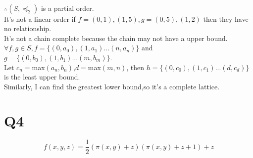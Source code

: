 \documentclass[12pt]{article}
\begin{document}
\begin{enumerate}[(i)]
\\$\therefore (S,\preceq_2)$ is a partial order.
\\It's not a linear order if $f={(0,1),(1,5)},g={(0,5),(1,2)}$ then they have no relationship.
\\It's not a chain complete because the chain may not have a upper bound.
\\$\forall f,g\in S,f=\{(0,a_0),(1,a_1)...(n,a_n)\}$ and $g=\{(0,b_0),(1,b_1)...(m,b_m)\}$.\\Let $c_n=$max$(a_n,b_n)$,$d=$max$(m,n)$, then $h=\{(0,c_0),(1,c_1)...(d,c_d)\}$ is the least upper bound.
\\Similarly, I can find the greatest lower bound,so it's a complete lattice.
\end{enumerate}
\section{Q4}
$$f(x,y,z)=\frac{1}{2}(\pi(x,y)+z)(\pi(x,y)+z+1)+z$$
\end{document}
